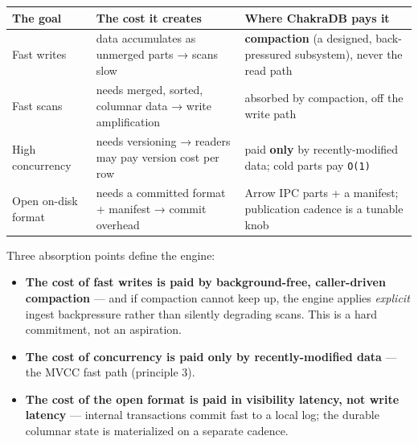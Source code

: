 \documentclass[
  11pt,
  openany]{book}
\providecommand{\tightlist}{%
  \setlength{\itemsep}{0pt}\setlength{\parskip}{0pt}}
\begin{document}
\begin{longtable}[]{@{}
  >{\raggedright\arraybackslash}p{}
  >{\raggedright\arraybackslash}p{}
  >{\raggedright\arraybackslash}p{}@{}}
\toprule\noalign{}
\begin{minipage}[b]{\linewidth}\raggedright
The goal
\end{minipage} & \begin{minipage}[b]{\linewidth}\raggedright
The cost it creates
\end{minipage} & \begin{minipage}[b]{\linewidth}\raggedright
Where ChakraDB pays it
\end{minipage} \\
\midrule\noalign{}
\endhead
\bottomrule\noalign{}
\endlastfoot
Fast writes & data accumulates as unmerged parts → scans slow &
\textbf{compaction} (a designed, back-pressured subsystem), never the
read path \\
Fast scans & needs merged, sorted, columnar data → write amplification &
absorbed by compaction, off the write path \\
High concurrency & needs versioning → readers may pay version cost per
row & paid \textbf{only} by recently-modified data; cold parts pay
\texttt{O(1)} \\
Open on-disk format & needs a committed format + manifest → commit
overhead & Arrow IPC parts + a manifest; publication cadence is a
tunable knob \\
\end{longtable}

Three absorption points define the engine:

\begin{itemize}
\tightlist
\item
  \textbf{The cost of fast writes is paid by background-free,
  caller-driven compaction} --- and if compaction cannot keep up, the
  engine applies \emph{explicit} ingest backpressure rather than
  silently degrading scans. This is a hard commitment, not an
  aspiration.
\item
  \textbf{The cost of concurrency is paid only by recently-modified
  data} --- the MVCC fast path (principle 3).
\item
  \textbf{The cost of the open format is paid in visibility latency, not
  write latency} --- internal transactions commit fast to a local log;
  the durable columnar state is materialized on a separate cadence.
\end{itemize}
\end{document}

